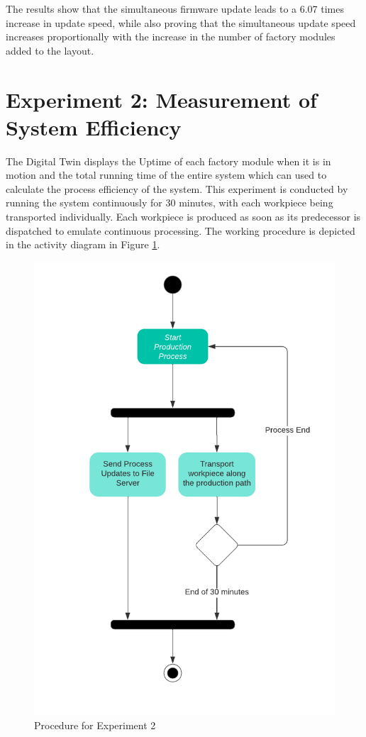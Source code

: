 The results show that the simultaneous firmware update leads to a 6.07 times increase in update speed, while also proving that the simultaneous update speed increases proportionally with the increase in the number of factory modules added to the layout.

\section{Experiment 2: Measurement of System Efficiency}
The Digital Twin displays the Uptime of each factory module when it is in motion and the total running time of the entire system which can used to calculate the process efficiency of the system. This experiment is conducted by running the system continuously for 30 minutes, with each workpiece being transported individually. Each workpiece is produced as soon as its predecessor is dispatched to emulate continuous processing. The working procedure is depicted in the activity diagram in Figure \ref{fig:exp2}.

\begin{figure}
    \centering
    \includegraphics{images/Exp2.png}
    \caption{Procedure for Experiment 2}
    \label{fig:exp2}
\end{figure}

